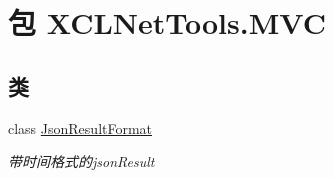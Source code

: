 \hypertarget{namespace_x_c_l_net_tools_1_1_m_v_c}{\section{包 X\-C\-L\-Net\-Tools.\-M\-V\-C}
\label{namespace_x_c_l_net_tools_1_1_m_v_c}
}
\subsection*{类}
\begin{DoxyCompactItemize}
\item 
class \hyperlink{class_x_c_l_net_tools_1_1_m_v_c_1_1_json_result_format}{Json\-Result\-Format}
\begin{DoxyCompactList}\small\item\em 带时间格式的json\-Result \end{DoxyCompactList}\end{DoxyCompactItemize}
